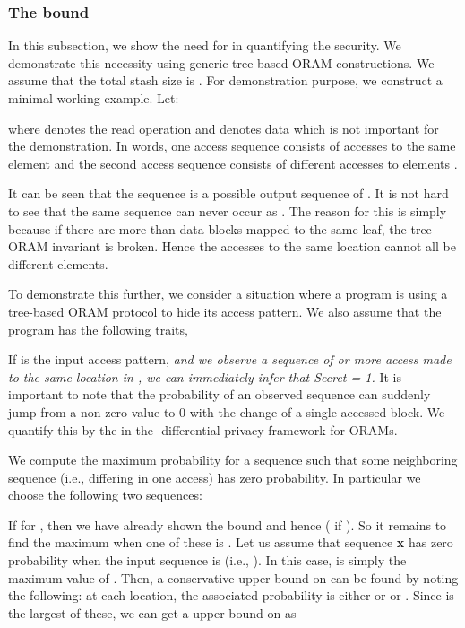 \documentclass[USenglish,oneside,twocolumn]{article}
\begin{document}
\vspace{-2em}
\subsubsection{\textbf{The  bound}}\label{attack}
\vspace{-1em}


In this subsection, we show the need for  in quantifying the security. We demonstrate this necessity using generic tree-based ORAM constructions. We assume that the total stash size is .
For demonstration purpose, we construct a minimal working example. Let: 

where  denotes the read operation and  denotes data which is not important for the demonstration. In words, one access sequence consists of  accesses to the same element and the second access sequence consists of  different accesses to elements . 

It can be seen that the sequence  is a possible output sequence of . 
It is not hard to see that the same sequence  can never occur as . The reason for this is simply because if there are more than  data blocks mapped to the same leaf, the tree ORAM invariant is broken. Hence the  accesses to the same location cannot all be different elements. 

To demonstrate this further, we consider a situation where a program is using a tree-based ORAM protocol to hide its access pattern. We also assume that the program has the following traits,

If  is the input access pattern, \textit{and we observe a sequence of  or more access made to the same location in , we can immediately infer that Secret = 1.} 
It is important to note that the probability of an observed sequence can suddenly jump from a non-zero value to 0 with the change of a single accessed block. We quantify this by the  in the -differential privacy framework for ORAMs. 

We compute the maximum probability for a sequence such that some neighboring sequence (i.e., differing in one access) has zero probability. In particular we choose the following two sequences:

If  for , then we have already shown the  bound and hence  ( if ). So it remains to find the maximum  when one of these is . Let us assume that sequence \textbf{x} has zero probability when the input sequence is  (i.e., ). In this case,  is simply the maximum value of . Then, a conservative upper bound on  can be found by noting the following: at each location, the associated probability is either  or  or . Since  is the largest of these, we can get a upper bound on  as
\end{document}
